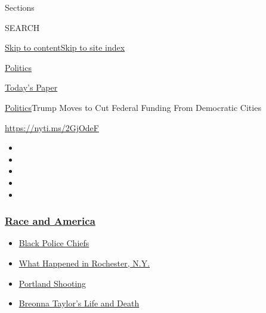 Sections

SEARCH

\protect\hyperlink{site-content}{Skip to
content}\protect\hyperlink{site-index}{Skip to site index}

\href{https://www.nytimes3xbfgragh.onion/section/politics}{Politics}

\href{https://myaccount.nytimes3xbfgragh.onion/auth/login?response_type=cookie\&client_id=vi}{}

\href{https://www.nytimes3xbfgragh.onion/section/todayspaper}{Today's
Paper}

\href{/section/politics}{Politics}\textbar{}Trump Moves to Cut Federal
Funding From Democratic Cities

\url{https://nyti.ms/2GjOdeF}

\begin{itemize}
\item
\item
\item
\item
\item
\end{itemize}

\hypertarget{race-and-america}{%
\subsubsection{\texorpdfstring{\href{https://www.nytimes3xbfgragh.onion/news-event/george-floyd-protests-minneapolis-new-york-los-angeles?name=styln-george-floyd\&region=TOP_BANNER\&block=storyline_menu_recirc\&action=click\&pgtype=Article\&impression_id=6777ebe0-f52c-11ea-bd9d-0b405bc82d81\&variant=undefined}{Race
and America}}{Race and America}}\label{race-and-america}}

\begin{itemize}
\tightlist
\item
  \href{https://www.nytimes3xbfgragh.onion/2020/09/11/us/black-police-chiefs-reform.html?name=styln-george-floyd\&region=TOP_BANNER\&block=storyline_menu_recirc\&action=click\&pgtype=Article\&impression_id=6777ebe1-f52c-11ea-bd9d-0b405bc82d81\&variant=undefined}{Black
  Police Chiefs}
\item
  \href{https://www.nytimes3xbfgragh.onion/2020/09/04/nyregion/rochester-police-daniel-prude.html?name=styln-george-floyd\&region=TOP_BANNER\&block=storyline_menu_recirc\&action=click\&pgtype=Article\&impression_id=6777ebe2-f52c-11ea-bd9d-0b405bc82d81\&variant=undefined}{What
  Happened in Rochester, N.Y.}
\item
  \href{https://www.nytimes3xbfgragh.onion/2020/08/30/us/portland-shooting-explained.html?name=styln-george-floyd\&region=TOP_BANNER\&block=storyline_menu_recirc\&action=click\&pgtype=Article\&impression_id=6777ebe3-f52c-11ea-bd9d-0b405bc82d81\&variant=undefined}{Portland
  Shooting}
\item
  \href{https://www.nytimes3xbfgragh.onion/2020/08/30/us/breonna-taylor-police-killing.html?name=styln-george-floyd\&region=TOP_BANNER\&block=storyline_menu_recirc\&action=click\&pgtype=Article\&impression_id=6777ebe4-f52c-11ea-bd9d-0b405bc82d81\&variant=undefined}{Breonna
  Taylor's Life and Death}
\end{itemize}

